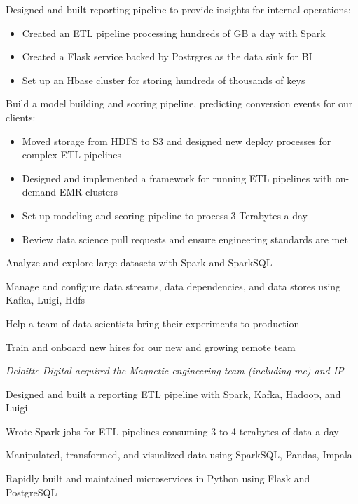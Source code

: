 \documentclass[]{deedy-resume-openfont}
\begin{document}
\vspace{\topsep} %
\begin{tightemize}
\item Designed and built reporting pipeline to provide insights for internal operations:
  \begin{itemize}
  \item Created an ETL pipeline processing hundreds of GB a day with Spark
  \item Created a Flask service backed by Postrgres as the data sink for BI
  \item Set up an Hbase cluster for storing hundreds of thousands of keys
  \end{itemize}
\item Build a model building and scoring pipeline, predicting conversion events for our clients:
  \begin{itemize}
  \item Moved storage from HDFS to S3 and designed new deploy processes for complex ETL pipelines
  \item Designed and implemented a framework for running ETL pipelines with on-demand EMR clusters
  \item Set up modeling and scoring pipeline to process 3 Terabytes a day
  \item Review data science pull requests and ensure engineering standards are met
  \end{itemize}
\item Analyze and explore large datasets with Spark and SparkSQL
\item Manage and configure data streams, data dependencies, and data stores using Kafka, Luigi, Hdfs
\item Help a team of data scientists bring their experiments to production
\item Train and onboard new hires for our new and growing remote team
\end{tightemize}
\sectionsep

\vspace{\topsep} %
\textit{Deloitte Digital acquired the Magnetic engineering team (including me) and IP}
\vspace{\topsep} %
\begin{tightemize}
\item Designed and built a reporting ETL pipeline with Spark, Kafka, Hadoop, and Luigi
\item Wrote Spark jobs for ETL pipelines consuming 3 to 4 terabytes of data a day
\item Manipulated, transformed, and visualized data using SparkSQL, Pandas, Impala
\item Rapidly built and maintained microservices in Python using Flask and PostgreSQL
\end{tightemize}
\sectionsep
\end{document}
